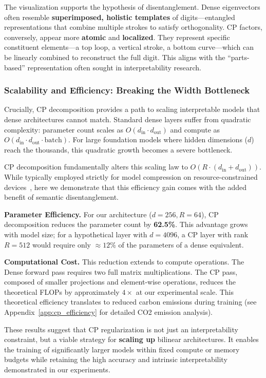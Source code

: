 The visualization supports the hypothesis of disentanglement. Dense eigenvectors often resemble \textbf{superimposed, holistic templates} of digits—entangled representations that combine multiple strokes to satisfy orthogonality. CP factors, conversely, appear more \textbf{atomic} and \textbf{localized}. They represent specific constituent elements—a top loop, a vertical stroke, a bottom curve—which can be linearly combined to reconstruct the full digit. This aligns with the ``parts-based'' representation often sought in interpretability research.

\subsubsection{Scalability and Efficiency: Breaking the Width Bottleneck}

Crucially, CP decomposition provides a path to scaling interpretable models that dense architectures cannot match. Standard dense layers suffer from quadratic complexity: parameter count scales as $O(d_{\text{in}} \cdot d_{\text{out}})$ and compute as $O(d_{\text{in}} \cdot d_{\text{out}} \cdot \text{batch})$. For large foundation models where hidden dimensions ($d$) reach the thousands, this quadratic growth becomes a severe bottleneck.

CP decomposition fundamentally alters this scaling law to $O(R \cdot (d_{\text{in}} + d_{\text{out}}))$. While typically employed strictly for model compression on resource-constrained devices~\cite{veeramacheneni2022canonical, cao2024learning}, here we demonstrate that this efficiency gain comes with the added benefit of semantic disentanglement.

\textbf{Parameter Efficiency.} For our architecture ($d=256, R=64$), CP decomposition reduces the parameter count by \textbf{62.5\%}. This advantage grows with model size; for a hypothetical layer with $d=4096$, a CP layer with rank $R=512$ would require only $\approx 12\%$ of the parameters of a dense equivalent.

\textbf{Computational Cost.} This reduction extends to compute operations. The Dense forward pass requires two full matrix multiplications. The CP pass, composed of smaller projections and element-wise operations, reduces the theoretical FLOPs by approximately $4\times$ at our experimental scale. This theoretical efficiency translates to reduced carbon emissions during training (see Appendix~\ref{app:cp_efficiency} for detailed CO2 emission analysis).

These results suggest that CP regularization is not just an interpretability constraint, but a viable strategy for \textbf{scaling up} bilinear architectures. It enables the training of significantly larger models within fixed compute or memory budgets while retaining the high accuracy and intrinsic interpretability demonstrated in our experiments.

